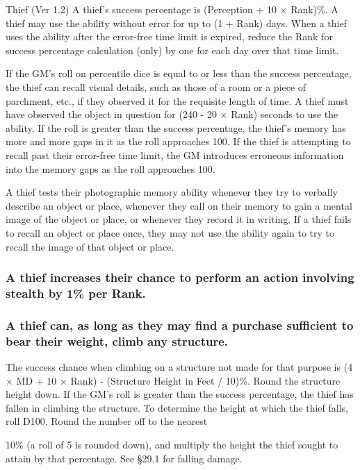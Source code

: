 \begin{Chapter}{Thief (Ver 1.2)}
A thief’s success percentage is (Perception + 10 × Rank)\%.  A thief
may use the ability without error for up to (1 + Rank) days.  When a
thief uses the ability after the error-free time limit is expired,
reduce the Rank for success percentage calculation (only) by one for
each day over that time limit.

If the GM’s roll on percentile dice is equal to or less than the
success percentage, the thief can recall visual details, such as those
of a room or a piece of parchment, etc., if they observed it for the
requisite length of time.  A thief must have observed the object in
question for (240 - 20 × Rank) seconds to use the ability. If the roll
is greater than the success percentage, the thief’s memory has more
and more gaps in it as the roll approaches 100.  If the thief is
attempting to recall past their error-free time limit, the GM
introduces erroneous information into the memory gaps as the roll
approaches 100.

A thief tests their photographic memory ability whenever they try to
verbally describe an object or place, whenever they call on their
memory to gain a mental image of the object or place, or whenever they
record it in writing. If a thief fails to recall an object or place
once, they may not use the ability again to try to recall the image of
that object or place.

\subsubsection{A thief increases their chance to perform an action involving stealth
by 1\% per Rank.}

\subsubsection{A thief can, as long as they may find a purchase sufficient to bear
their weight, climb any structure.}

The success chance when climbing on a structure not made for that
purpose is (4 × MD + 10 × Rank) - (Structure Height in Feet /
10)\%. Round the structure height down.  If the GM’s roll is greater
than the success percentage, the thief has fallen in climbing the
structure.  To determine the height at which the thief falls, roll
D100. Round the number off to the nearest

10\% (a roll of 5 is rounded down), and multiply the height the thief
sought to attain by that percentage.  See §29.1 for falling damage.

\end{Chapter}
